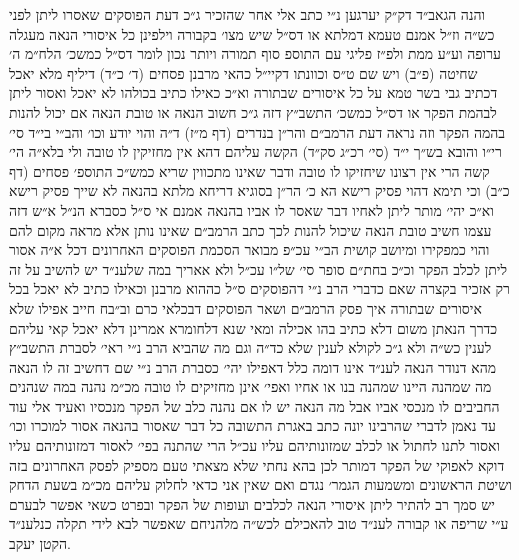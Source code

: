 \documentclass[12pt, openany]{book}
\begin{document}
\begin{multicols}{2}
והנה הגאב״ד דק״ק יערגען נ״י כתב אלי אחר שהזכיר ג״כ דעת הפוסקים שאסרו ליתן לפני כש״ה וז״ל אמנם טעמא דמלתא או דס״ל שיש מצו׳ בקבורה וילפינן כל איסורי הנאה מעגלה ערופה וע״ע ממת ולפ״ז פליגי עם התוספ סוף תמורה ויותר נכון לומר דס״ל כמשכ׳ הלח״מ ה׳ שחיטה (פ״ב) ויש שם ט״ס וכוונתו דקיי״ל כהאי מרבנן פסחים (ד׳ כ״ד) דיליף מלא יאכל דכתיב גבי בשר טמא על כל איסורים שבתורה וא״כ כאילו כתיב בכולהו לא יאכל ואסור ליתן לבהמת הפקר או דס״ל כמשכ׳ התשב״ץ דזה ג״כ חשוב הנאה או טובת הנאה אם יכול להנות בהמה הפקר וזה נראה דעת הרמב״ם והר״ן בנדרים (דף מ״ז) ד״ה והוי יודע וכו׳ והב״י בי״ד סי׳ רי״ו והובא בש״ך י״ד (סי׳ רכ״ג סק״ד) הקשה עליהם דהא אין מחזיקין לו טובה ולי בלא״ה הי׳ קשה הרי אין רצונו שיחזיקו לו טובה ודבר שאינו מתכווין שריא כמש״כ התוספ׳ פסחים (דף כ״ב) וכי תימא דהוי פסיק רישא הא כ׳ הר״ן בסוגיא דריחא מלתא בהנאה לא שייך פסיק רישא וא״כ יהי׳ מותר ליתן לאחיו דבר שאסר לו אביו בהנאה אמנם אי ס״ל כסברא הנ״ל א״ש דזה עצמו חשיב טובת הנאה שיכול להנות לכך כתב הרמב״ם שאינו נותן אלא מראה מקום להם והוי כמפקירו ומיושב קושית הב״י עכ״פ מבואר הסכמת הפוסקים האחרונים דכל א״ה אסור ליתן לכלב הפקר וכ״כ בחת״ם סופר סי׳ של״ו עכ״ל ולא אאריך במה שלענ״ד יש להשיב על זה רק אזכיר בקצרה שאם כדברי הרב נ״י דהפוסקים ס״ל כההוא מרבנן וכאילו כתיב לא יאכל בכל איסורים שבתורה איך פסק הרמב״ם ושאר הפוסקים דבכלאי כרם וב״בח חייב אפילו שלא כדרך הנאתן משום דלא כתיב בהו אכילה ומאי שנא דלחומרא אמרינן דלא יאכל קאי עליהם לענין כש״ה ולא ג״כ לקולא לענין שלא כד״ה וגם מה שהביא הרב נ״י ראי׳ לסברת התשב״ץ מהא דנודר הנאה לענ״ד אינו דומה כלל דאפילו יהי׳ כסברת הרב נ״י שם דחשיב זה לו הנאה מה שמהנה היינו שמהנה בנו או אחיו ואפי׳ אינן מחזיקים לו טובה מכ״מ נהנה במה שנהנים החביבים לו מנכסי אביו אבל מה הנאה יש לו אם נהנה כלב של הפקר מנכסיו ואעיד אלי עוד עד נאמן לדברי שהרבינו יונה כתב באגרת התשובה כל דבר שאסור בהנאה אסור למוכרו וכו׳ ואסור לתנו לחתול או לכלב שמזונותיהם עליו עכ״ל הרי שהתנה בפי׳ לאסור דמזונותיהם עליו דוקא לאפוקי של הפקר דמותר לכן בהא נחתי שלא מצאתי טעם מספיק לפסק האחרונים בזה ושיטת הראשונים ומשמעות הגמר׳ נגדם ואם שאין אני כדאי לחלוק עליהם מכ״מ בשעת הדחק יש סמך רב להתיר ליתן איסורי הנאה לכלבים ועופות של הפקר ובפרט כשאי אפשר לבערם ע״י שריפה או קבורה לענ״ד טוב להאכילם לכש״ה מלהניחם שאפשר לבא לידי תקלה כנלענ״ד הקטן יעקב.\\\vspace{0pt}

\end{multicols}\newpage
\end{document}
